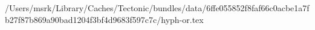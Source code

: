 /Users/msrk/Library/Caches/Tectonic/bundles/data/6ffe055852f8faf66c0acbe1a7fb27f87b869a90bad1204f3bf4d9683f597c7c/hyph-or.tex